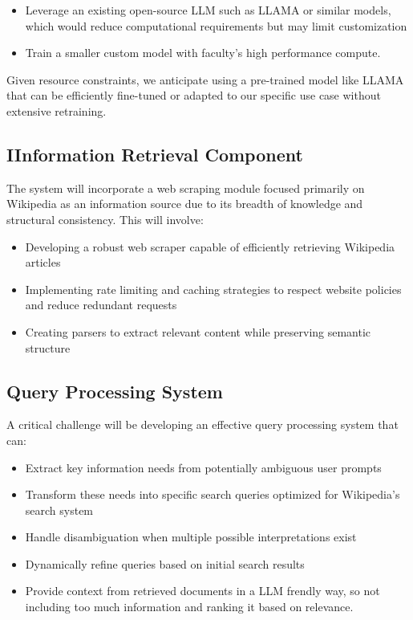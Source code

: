 \documentclass[fleqn,moreauthors,10pt]{ds_report}
\begin{document}
\begin{itemize}
\item Leverage an existing open-source LLM such as LLAMA or similar models, which would reduce computational requirements but may limit customization
\item Train a smaller custom model with faculty's high performance compute.
\end{itemize}
Given resource constraints, we anticipate using a pre-trained model like LLAMA that can be efficiently fine-tuned or adapted to our specific use case without extensive retraining.

\subsection*{IInformation Retrieval Component}
The system will incorporate a web scraping module focused primarily on Wikipedia as an information source due to its breadth of knowledge and structural consistency. This will involve:

\begin{itemize}
\item Developing a robust web scraper capable of efficiently retrieving Wikipedia articles
\item Implementing rate limiting and caching strategies to respect website policies and reduce redundant requests
\item Creating parsers to extract relevant content while preserving semantic structure
\end{itemize}

\subsection*{Query Processing System}
A critical challenge will be developing an effective query processing system that can:

\begin{itemize}
\item Extract key information needs from potentially ambiguous user prompts
\item Transform these needs into specific search queries optimized for Wikipedia's search system
\item Handle disambiguation when multiple possible interpretations exist
\item Dynamically refine queries based on initial search results
\item Provide context from retrieved documents in a LLM frendly way, so not including too much information and ranking it based on relevance.
\end{itemize}
\end{document}
